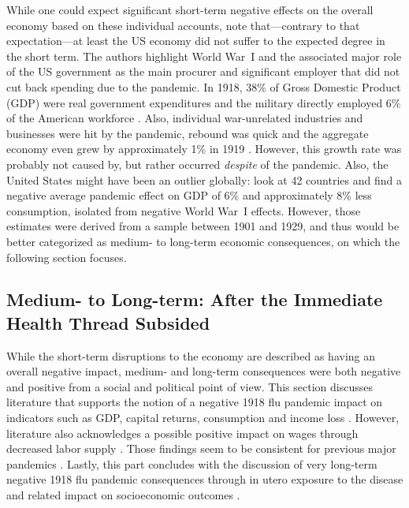 \documentclass[12pt,a4paper]{article}
\begin{document}
While one could expect significant short-term negative effects on the overall economy based on these individual accounts, \cite{benmelech1918InfluenzaDid2020} note that---contrary to that expectation---at least the US economy did not suffer to the expected degree in the short term.
The authors highlight World War~I and the associated major role of the US government as the main procurer and significant employer that did not cut back spending due to the pandemic.
In 1918, 38\% of Gross Domestic Product (GDP) were real government expenditures and the military directly employed 6\% of the American workforce \citep{benmelech1918InfluenzaDid2020}.
Also, individual war-unrelated industries and businesses were hit by the pandemic, rebound was quick and the aggregate economy even grew by approximately 1\% in 1919 \citep{romerWorldWarPostwar1988}.
However, this growth rate was probably not caused by, but rather occurred \textit{despite} of the pandemic.
Also, the United States might have been an outlier globally:
\cite{barroCoronavirusGreatInfluenza2020} look at 42 countries and find a negative average pandemic effect on GDP of 6\% and approximately 8\% less consumption, isolated from negative World War~I effects.
However, those estimates were derived from a sample between 1901 and 1929, and thus would be better categorized as medium- to long-term economic consequences, on which the following section focuses.


\subsection{Medium- to Long-term: After the Immediate Health Thread Subsided} \label{sec:medlong}

While the short-term disruptions to the economy are described as having an overall negative impact, medium- and long-term consequences were both negative and positive from a social and political point of view.
This section discusses literature that supports the notion of a negative 1918 flu pandemic impact on indicators such as GDP, capital returns, consumption \citep{karlssonImpact1918Spanish2014, barroCoronavirusGreatInfluenza2020, correiaPandemicsDepressEconomy2020} and income loss \citep{fanInclusiveCostPandemic2016}.
However, literature also acknowledges a possible positive impact on wages through decreased labor supply \citep{brainerdEconomicEffects19182003}.
Those findings seem to be consistent for previous major pandemics \citep{jordaLongerrunEconomicConsequences2020}.
Lastly, this part concludes with the discussion of very long-term negative 1918 flu pandemic consequences through in utero exposure to the disease and related impact on socioeconomic outcomes \citep{almond1918InfluenzaPandemic2006}.
\end{document}
